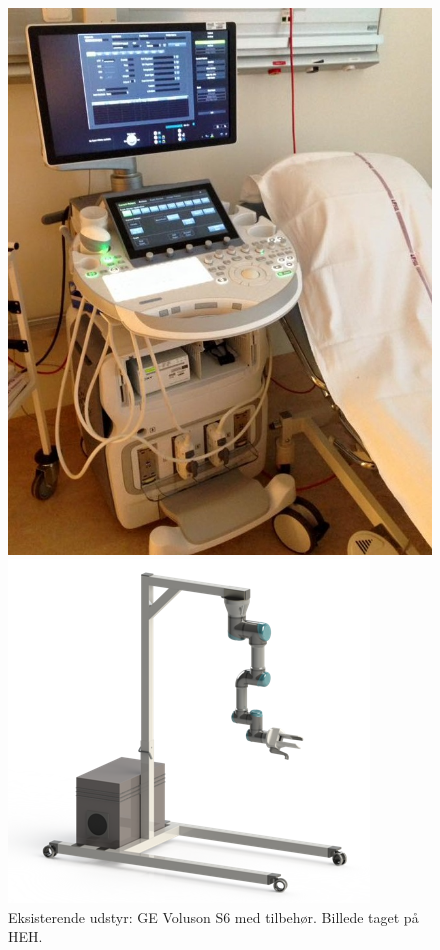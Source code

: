 \begin{figure}[H]
	\begin{minipage}{0.45\textwidth}
		\centering
		\includegraphics[width=\textwidth]{Figurer/udstyrHorsens.jpg}
		\caption{Eksisterende udstyr: GE Voluson S6 med tilbehør. Billede taget på HEH.}
		\label{udstyrHorsens}
	\end{minipage}
	\hspace{0.02\textwidth}
	\begin{minipage}{0.58\textwidth}
		\centering
		\includegraphics[width=\textwidth]{Figurer/StativMedUR3Render.png}

\end{minipage}
\end{figure}
